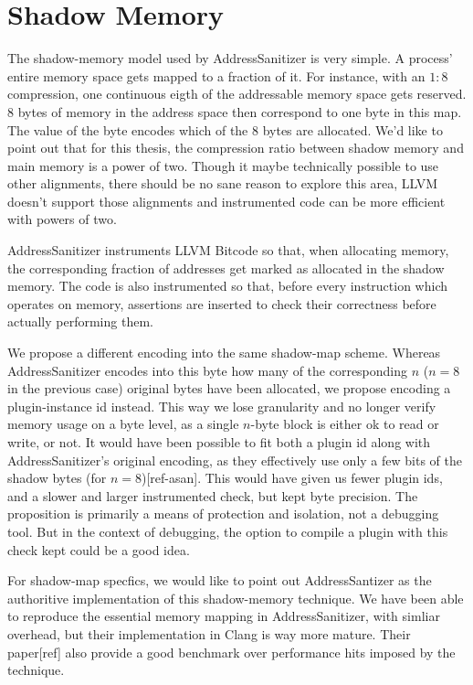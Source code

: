 \chapter {Shadow Memory}

The shadow-memory model used by AddressSanitizer is very simple.
A process' entire memory space gets mapped to a fraction of it.
For instance, with an $1:8$ compression, one continuous eigth of the addressable
memory space gets reserved.
$8$ bytes of memory in the address space then correspond to one byte in this
map.
The value of the byte encodes which of the $8$ bytes are allocated.
We'd like to point out that for this thesis, the compression ratio between
shadow memory and main memory is a power of two.
Though it maybe technically possible to use other alignments, there should be no
sane reason to explore this area, LLVM doesn't support those alignments and
instrumented code can be more efficient with powers of two.

AddressSanitizer instruments LLVM Bitcode so that, when allocating memory, the
corresponding fraction of addresses get marked as allocated in the shadow
memory.
The code is also instrumented so that, before every instruction which operates
on memory, assertions are inserted to check their correctness before actually
performing them.

We propose a different encoding into the same shadow-map scheme.
Whereas AddressSanitizer encodes into this byte how many of the corresponding
$n$ ($n = 8$ in the previous case) original bytes have been allocated, we
propose encoding a plugin-instance id instead.
This way we lose granularity and no longer verify memory usage on a byte level,
as a single $n$-byte block is either ok to read or write, or not.
It would have been possible to fit both a plugin id along with
AddressSanitizer's original encoding, as they effectively use only a few bits of
the shadow bytes (for $n=8$)[ref-asan].
This would have given us fewer plugin ids, and a slower and larger instrumented
check, but kept byte precision.
The proposition is primarily a means of protection and isolation, not a
debugging tool.
But in the context of debugging, the option to compile a plugin with this check
kept could be a good idea.

For shadow-map specfics, we would like to point out AddressSantizer as the
authoritive implementation of this shadow-memory technique. We have been able to
reproduce the essential memory mapping in AddressSanitizer, with simliar
overhead, but their implementation in Clang is way more mature. Their
paper[ref] also provide a good benchmark over performance hits imposed by the
technique.


